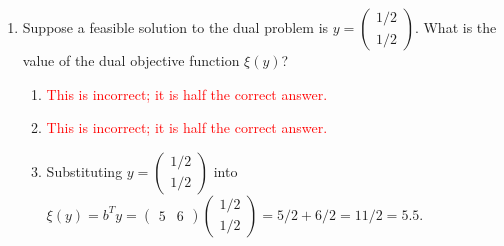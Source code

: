 \documentclass{article}%
\newcommand{\incorrect}[1]{\textcolor{red}{#1}}
\begin{document}
\begin{enumerate}
\begin{enumerate}
\begin{enumerate}
\item We check the constraints: $Ax = \begin{pmatrix} 1 & 2 \\ 3 & 4 \end{pmatrix} \begin{pmatrix} 0 \\ 2 \end{pmatrix} = \begin{pmatrix} 4 \\ 8 \end{pmatrix}$. Since $\begin{pmatrix} 4 \\ 8 \end{pmatrix} \le \begin{pmatrix} 5 \\ 6 \end{pmatrix}$ and $x \ge 0$, the solution is feasible.%
\item \incorrect{This is incorrect; the solution satisfies the constraints.}%
\item \incorrect{This is incorrect; feasibility can be determined by checking the constraints.}%
\item \incorrect{This is incorrect; the feasibility of $x$ is independent of $c$.}%
\item \incorrect{This is incorrect; the feasibility of $x$ is independent of $b$.}%
\end{enumerate}%
\vspace{0.5em}%
\item Suppose a feasible solution to the dual problem is $y = \begin{pmatrix} 1/2 \\ 1/2 \end{pmatrix}$. What is the value of the dual objective function $\xi(y)$?%
\begin{enumerate}%
\item \incorrect{This is incorrect; it is half the correct answer.}%
\item \incorrect{This is incorrect; it is half the correct answer.}%
\item Substituting $y = \begin{pmatrix} 1/2 \\ 1/2 \end{pmatrix}$ into $\xi(y) = b^T y = \begin{pmatrix} 5 & 6 \end{pmatrix} \begin{pmatrix} 1/2 \\ 1/2 \end{pmatrix} = 5/2 + 6/2 = 11/2 = 5.5$.%

\end{enumerate}
\end{enumerate}
\end{enumerate}
\end{document}
